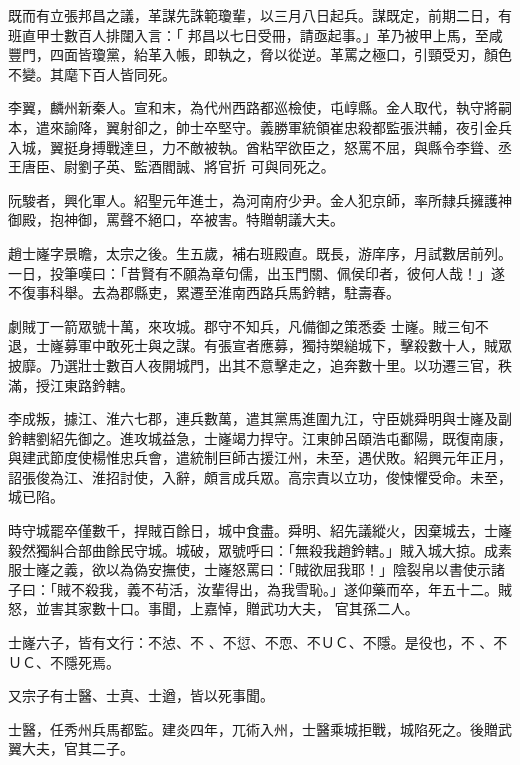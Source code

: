 \begin{pinyinscope}
 既而有立張邦昌之議，革謀先誅範瓊輩，以三月八日起兵。謀既定，前期二日，有班直甲士數百人排闥入言：「
 邦昌以七日受冊，請亟起事。」革乃被甲上馬，至咸豐門，四面皆瓊黨，紿革入帳，即執之，脅以從逆。革罵之極口，引頸受刃，顏色不變。其麾下百人皆同死。



 李翼，麟州新秦人。宣和末，為代州西路都巡檢使，屯崞縣。金人取代，執守將嗣本，遣來諭降，翼射卻之，帥士卒堅守。義勝軍統領崔忠殺都監張洪輔，夜引金兵入城，翼挺身搏戰達旦，力不敵被執。酋粘罕欲臣之，怒罵不屈，與縣令李聳、丞王唐臣、尉劉子英、監酒閻誠、將官折
 可與同死之。



 阮駿者，興化軍人。紹聖元年進士，為河南府少尹。金人犯京師，率所隸兵擁護神御殿，抱神御，罵聲不絕口，卒被害。特贈朝議大夫。



 趙士嶐字景瞻，太宗之後。生五歲，補右班殿直。既長，游庠序，月試數居前列。一日，投筆嘆曰：「昔賢有不願為章句儒，出玉門關、佩侯印者，彼何人哉！」遂不復事科舉。去為郡縣吏，累遷至淮南西路兵馬鈐轄，駐壽春。



 劇賊丁一箭眾號十萬，來攻城。郡守不知兵，凡備御之策悉委
 士嶐。賊三旬不退，士嶐募軍中敢死士與之謀。有張宣者應募，獨持槊縋城下，擊殺數十人，賊眾披靡。乃選壯士數百人夜開城門，出其不意擊走之，追奔數十里。以功遷三官，秩滿，授江東路鈐轄。



 李成叛，據江、淮六七郡，連兵數萬，遣其黨馬進圍九江，守臣姚舜明與士嶐及副鈐轄劉紹先御之。進攻城益急，士嶐竭力捍守。江東帥呂頤浩屯鄱陽，既復南康，與建武節度使楊惟忠兵會，遣統制巨師古援江州，未至，遇伏敗。紹興元年正月，
 詔張俊為江、淮招討使，入辭，頗言成兵眾。高宗責以立功，俊悚懼受命。未至，城已陷。



 時守城罷卒僅數千，捍賊百餘日，城中食盡。舜明、紹先議縱火，因棄城去，士嶐毅然獨糾合部曲餘民守城。城破，眾號呼曰：「無殺我趙鈐轄。」賊入城大掠。成素服士嶐之義，欲以為偽安撫使，士嶐怒罵曰：「賊欲屈我耶！」陰裂帛以書使示諸子曰：「賊不殺我，義不茍活，汝輩得出，為我雪恥。」遂仰藥而卒，年五十二。賊怒，並害其家數十口。事聞，上嘉悼，贈武功大夫，
 官其孫二人。


士嶐六子，皆有文行：不惉、不
 、不愆、不恧、不ＵＣ、不隱。是役也，不
 、不ＵＣ、不隱死焉。



 又宗子有士醫、士真、士遒，皆以死事聞。



 士醫，任秀州兵馬都監。建炎四年，兀術入州，士醫乘城拒戰，城陷死之。後贈武翼大夫，官其二子。




\end{pinyinscope}

